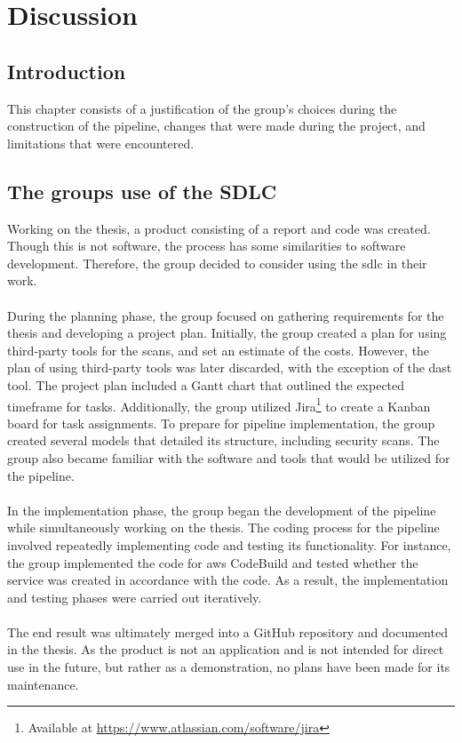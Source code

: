 \chapter{Discussion}
\section{Introduction}
This chapter consists of a justification of the group's choices during the construction of the pipeline, changes that were made during the project, and limitations that were encountered.  


\section{The groups use of the SDLC} %
Working on the thesis, a product consisting of a report and code was created. Though this is not software, the process has some similarities to software development. Therefore, the group decided to consider using the \acrshort{sdlc} in their work.
\\~\\
During the planning phase, the group focused on gathering requirements for the thesis and developing a project plan. Initially, the group created a plan for using third-party tools for the scans, and set an estimate of the costs. However, the plan of using third-party tools was later discarded, with the exception of the \acrshort{dast} tool. The project plan included a Gantt chart that outlined the expected timeframe for tasks. Additionally, the group utilized Jira\footnote{Available at \url{https://www.atlassian.com/software/jira}} to create a Kanban board for task assignments. To prepare for pipeline implementation, the group created several models that detailed its structure, including security scans. The group also became familiar with the software and tools that would be utilized for the pipeline.
\\~\\
In the implementation phase, the group began the development of the pipeline while simultaneously working on the thesis. The coding process for the pipeline involved repeatedly implementing code and testing its functionality. For instance, the group implemented the code for \acrshort{aws} CodeBuild and tested whether the service was created in accordance with the code. As a result, the implementation and testing phases were carried out iteratively.
\\~\\
The end result was ultimately merged into a GitHub repository and documented in the thesis. As the product is not an application and is not intended for direct use in the future, but rather as a demonstration, no plans have been made for its maintenance. 

